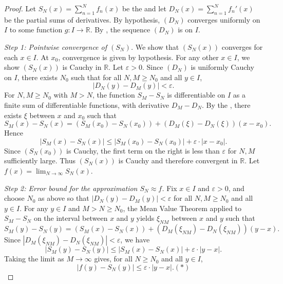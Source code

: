 \begin{proof}
    Let $S_N(x) = \sum_{n=1}^N f_n(x)$ be the  and let $D_N(x) = \sum_{n=1}^N f_n'(x)$ be the partial sums of derivatives. By hypothesis, $(D_N)$ converges uniformly on $I$ to some function $g : I \to \mathbb{R}$. By , the sequence $(D_N)$ is  on $I$.

    \medskip
    \noindent\textit{Step 1: Pointwise convergence of $(S_N)$.} We show that $(S_N(x))$ converges for each $x \in I$. At $x_0$, convergence is given by hypothesis. For any other $x \in I$, we show $(S_N(x))$ is Cauchy in $\mathbb{R}$. Let $\varepsilon > 0$. Since $(D_N)$ is uniformly Cauchy on $I$, there exists $N_0$ such that for all $N, M \geq N_0$ and all $y \in I$,
    $$|D_N(y) - D_M(y)| < \varepsilon.$$
    For $N, M \geq N_0$ with $M > N$, the function $S_M - S_N$ is differentiable on $I$ as a finite sum of differentiable functions, with derivative $D_M - D_N$. By the , there exists $\xi$ between $x$ and $x_0$ such that
    $$S_M(x) - S_N(x) = (S_M(x_0) - S_N(x_0)) + (D_M(\xi) - D_N(\xi))(x - x_0).$$
    Hence
    $$|S_M(x) - S_N(x)| \leq |S_M(x_0) - S_N(x_0)| + \varepsilon \cdot |x - x_0|.$$
    Since $(S_N(x_0))$ is Cauchy, the first term on the right is less than $\varepsilon$ for $N, M$ sufficiently large. Thus $(S_N(x))$ is Cauchy and therefore convergent in $\mathbb{R}$. Let $f(x) = \lim_{N \to \infty} S_N(x)$.

    \medskip
    \noindent\textit{Step 2: Error bound for the approximation $S_N \approx f$.} Fix $x \in I$ and $\varepsilon > 0$, and choose $N_0$ as above so that $|D_N(y) - D_M(y)| < \varepsilon$ for all $N, M \geq N_0$ and all $y \in I$. For any $y \in I$ and $M > N \geq N_0$, the Mean Value Theorem applied to $S_M - S_N$ on the interval between $x$ and $y$ yields $\xi_{NM}$ between $x$ and $y$ such that
    $$S_M(y) - S_N(y) = (S_M(x) - S_N(x)) + (D_M(\xi_{NM}) - D_N(\xi_{NM}))(y - x).$$
    Since $|D_M(\xi_{NM}) - D_N(\xi_{NM})| < \varepsilon$, we have
    $$|S_M(y) - S_N(y)| \leq |S_M(x) - S_N(x)| + \varepsilon \cdot |y - x|.$$
    Taking the limit as $M \to \infty$ gives, for all $N \geq N_0$ and all $y \in I$,
    $$|f(y) - S_N(y)| \leq \varepsilon \cdot |y - x|. (*)$$


\end{proof}

